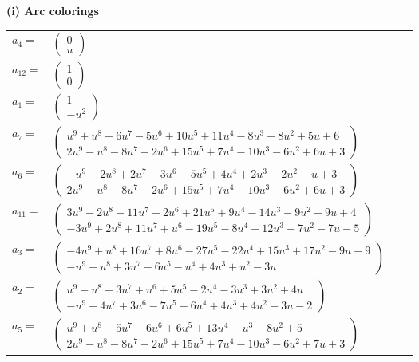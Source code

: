 \documentclass[1p]{elsarticle_modified}
\theoremstyle{definition}
\begin{document}
\flushleft \textbf{(i) Arc colorings}\\
\begin{tabular}{m{7pt} m{180pt} m{7pt} m{180pt} }
\flushright $a_{4}=$&$\begin{pmatrix}0\\u\end{pmatrix}$ \\
\flushright $a_{12}=$&$\begin{pmatrix}1\\0\end{pmatrix}$ \\
\flushright $a_{1}=$&$\begin{pmatrix}1\\- u^2\end{pmatrix}$ \\
\flushright $a_{7}=$&$\begin{pmatrix}u^9+u^8-6 u^7-5 u^6+10 u^5+11 u^4-8 u^3-8 u^2+5 u+6\\2 u^9- u^8-8 u^7-2 u^6+15 u^5+7 u^4-10 u^3-6 u^2+6 u+3\end{pmatrix}$ \\
\flushright $a_{6}=$&$\begin{pmatrix}- u^9+2 u^8+2 u^7-3 u^6-5 u^5+4 u^4+2 u^3-2 u^2- u+3\\2 u^9- u^8-8 u^7-2 u^6+15 u^5+7 u^4-10 u^3-6 u^2+6 u+3\end{pmatrix}$ \\
\flushright $a_{11}=$&$\begin{pmatrix}3 u^9-2 u^8-11 u^7-2 u^6+21 u^5+9 u^4-14 u^3-9 u^2+9 u+4\\-3 u^9+2 u^8+11 u^7+u^6-19 u^5-8 u^4+12 u^3+7 u^2-7 u-5\end{pmatrix}$ \\
\flushright $a_{3}=$&$\begin{pmatrix}-4 u^9+u^8+16 u^7+8 u^6-27 u^5-22 u^4+15 u^3+17 u^2-9 u-9\\- u^9+u^8+3 u^7-6 u^5- u^4+4 u^3+u^2-3 u\end{pmatrix}$ \\
\flushright $a_{2}=$&$\begin{pmatrix}u^9- u^8-3 u^7+u^6+5 u^5-2 u^4-3 u^3+3 u^2+4 u\\- u^9+4 u^7+3 u^6-7 u^5-6 u^4+4 u^3+4 u^2-3 u-2\end{pmatrix}$ \\
\flushright $a_{5}=$&$\begin{pmatrix}u^9+u^8-5 u^7-6 u^6+6 u^5+13 u^4- u^3-8 u^2+5\\2 u^9- u^8-8 u^7-2 u^6+15 u^5+7 u^4-10 u^3-6 u^2+7 u+3\end{pmatrix}$ \\

\end{tabular}
\end{document}
